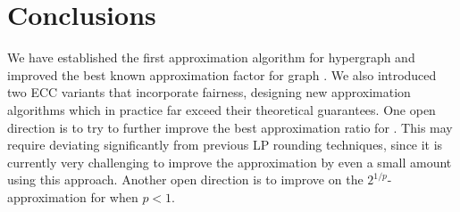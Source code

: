 \section{Conclusions}
We have established the first approximation algorithm for hypergraph \maxecc{} and improved the best known approximation factor for graph \maxecc{}. We also introduced two ECC variants that incorporate fairness, designing new approximation algorithms which in practice far exceed their theoretical guarantees. One open direction is to try to further improve the best approximation ratio for \maxecc{}. This may require deviating significantly from previous LP rounding techniques, since it is currently very challenging to improve the approximation by even a small amount using this approach. Another open direction is to improve on the $2^{1/p}$-approximation for \pmeanECC{} when $p< 1$.